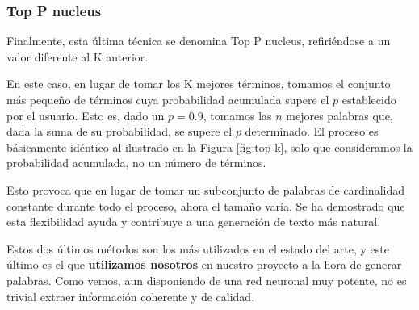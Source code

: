 \subsubsection{Top P nucleus}

Finalmente, esta última técnica se denomina Top P nucleus, refiriéndose a un valor diferente al K anterior.

En este caso, en lugar de tomar los K mejores términos, tomamos el conjunto más pequeño de términos cuya probabilidad acumulada supere el $p$ establecido por el usuario. Esto es, dado un $p = 0.9$, tomamos las $n$ mejores palabras que, dada la suma de su probabilidad, se supere el $p$ determinado. El proceso es básicamente idéntico al ilustrado en la Figura \ref{fig:top-k}, solo que consideramos la probabilidad acumulada, no un número de términos.

Esto provoca que en lugar de tomar un subconjunto de palabras de cardinalidad constante durante todo el proceso, ahora el tamaño varía. Se ha demostrado que esta flexibilidad ayuda y contribuye a una generación de texto más natural.

\vspace{15mm}
Estos dos últimos métodos son los más utilizados en el estado del arte, y este último es el que \textbf{utilizamos nosotros} en nuestro proyecto a la hora de generar palabras. Como vemos, aun disponiendo de una red neuronal muy potente, no es trivial extraer información coherente y de calidad.